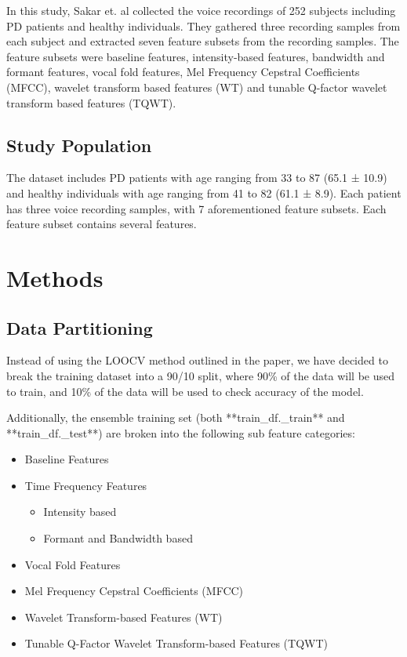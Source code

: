 \documentclass[
]{article}
\providecommand{\tightlist}{%
  \setlength{\itemsep}{0pt}\setlength{\parskip}{0pt}}
\begin{document}
In this study, Sakar et. al collected the voice recordings of 252 subjects including PD patients and healthy individuals. They gathered three recording samples from each subject and extracted seven feature subsets from the recording samples. The feature subsets were baseline features, intensity-based features, bandwidth and formant features, vocal fold features, Mel Frequency Cepstral Coefficients (MFCC), wavelet transform based features (WT) and tunable Q-factor wavelet transform based features (TQWT).

\hypertarget{study-population}{%
\subsection{Study Population}\label{study-population}}

The dataset includes PD patients with age ranging from 33 to 87 (65.1 ± 10.9) and healthy individuals with age
ranging from 41 to 82 (61.1 ± 8.9). Each patient has three voice recording samples, with 7 aforementioned
feature subsets. Each feature subset contains several features.

\newpage

\hypertarget{methods}{%
\section{Methods}\label{methods}}

\hypertarget{data-partitioning}{%
\subsection{Data Partitioning}\label{data-partitioning}}

Instead of using the LOOCV method outlined in the paper, we have decided to break the training dataset into a 90/10 split, where 90\% of the data will be used to train, and 10\% of the data will be used to check accuracy of the model.

Additionally, the ensemble training set (both **train\_df.\_train** and **train\_df.\_test**) are broken into the following sub feature categories:

\begin{itemize}
\tightlist
\item
  Baseline Features
\item
  Time Frequency Features

  \begin{itemize}
  \tightlist
  \item
    Intensity based
  \item
    Formant and Bandwidth based
  \end{itemize}
\item
  Vocal Fold Features
\item
  Mel Frequency Cepstral Coefficients (MFCC)
\item
  Wavelet Transform-based Features (WT)
\item
  Tunable Q-Factor Wavelet Transform-based Features (TQWT)
\end{itemize}
\end{document}
